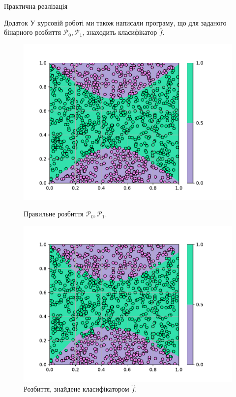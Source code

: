 \documentclass{zkdl-presentation-template}
\begin{document}
    \begin{frame}{Практична реалізація}
        \begin{alertblock}{Додаток}
            У курсовій роботі ми також написали програму, що для заданого
            бінарного розбиття $\mathcal{P}_0,\mathcal{P}_1$, знаходить
            класифікатор $\hat{f}$.
        \end{alertblock}

        \begin{figure}
            \begin{minipage}{0.475\textwidth}
                \centering
                \includegraphics[width=\textwidth]{../code/classification-example.pdf}
                \caption{Правильне розбиття $\mathcal{P}_0,\mathcal{P}_1$.}
            \end{minipage}\hfill
            \begin{minipage}{0.475\textwidth}
                \centering
                \includegraphics[width=\textwidth]{../code/classification-discr-prediction.pdf}
                \caption{Розбиття, знайдене класифікатором $\hat{f}$.}
            \end{minipage}
        \end{figure}
    \end{frame}
\end{document}
